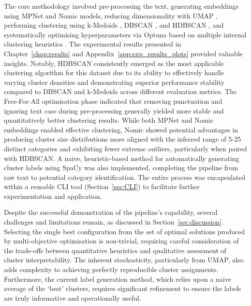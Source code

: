 \documentclass[10pt,oneside]{report}
\begin{document}
The core methodology involved pre-processing the text, generating embeddings using MPNet \cite{song2020mpnet} and Nomic \cite{nussbaum2024nomic} models, reducing dimensionality with UMAP \cite{mcinnes2018umap}, performing clustering using k-Medoids \cite{kmedoids}, DBSCAN \cite{ester1996density}, and HDBSCAN \cite{campello2013density}, and systematically optimising hyperparameters via Optuna \cite{akiba2019optuna} based on multiple internal clustering heuristics \cite{rousseeuw1987silhouettes, davies1979cluster, calinski1974dendrite}. The experimental results presented in Chapter~\ref{chap:results} and Appendix~\ref{app:exp_results_plots} provided valuable insights. Notably, HDBSCAN \cite{campello2013density} consistently emerged as the most applicable clustering algorithm for this dataset due to its ability to effectively handle varying cluster densities and demonstrating superior performance stability compared to DBSCAN and k-Medoids across different evaluation metrics. The Free-For-All optimisation phase indicated that removing punctuation and ignoring text case during pre-processing generally yielded more stable and quantitatively better clustering results. While both MPNet and Nomic embeddings enabled effective clustering, Nomic showed potential advantages in producing cluster size distributions more aligned with the inferred range of 5-25 distinct categories and exhibiting fewer extreme outliers, particularly when paired with HDBSCAN. A naive, heuristic-based method for automatically generating cluster labels using SpaCy \cite{spacy2} was also implemented, completing the pipeline from raw text to potential category identification. The entire process was encapsulated within a reusable CLI tool (Section~\ref{sec:CLI}) to facilitate further experimentation and application.

Despite the successful demonstration of the pipeline's capability, several challenges and limitations remain, as discussed in Section~\ref{sec:discussion}. Selecting the single best configuration from the set of optimal solutions produced by multi-objective optimisation is non-trivial, requiring careful consideration of the trade-offs between quantitative heuristics and qualitative assessment of cluster interpretability. The inherent stochasticity, particularly from UMAP, also adds complexity to achieving perfectly reproducible cluster assignments. Furthermore, the current label generation method, which relies upon a naive average of the `best' clusters, requires significant refinement to ensure the labels are truly informative and operationally useful.
\end{document}
